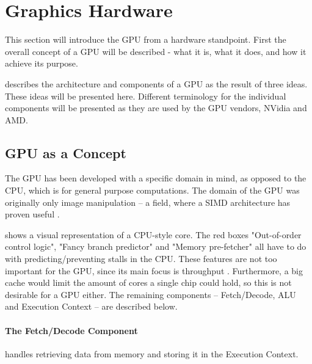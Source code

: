 \section{Graphics Hardware}\label{sec:graphics_hardware}


\begin{sectionmeta}
	
	This section will introduce the \gls{GPU} from a hardware standpoint. 
	First the overall concept of a \gls{GPU} will be described - what it is, what it does, and how it achieve its purpose.
	
	\cite{intro_to_gpu_arch} describes the architecture and components of a \gls{GPU} as the result of three ideas.
	These ideas will be presented here.
	Different terminology for the individual components will be presented as they are used by the \gls{GPU} vendors, NVidia and AMD. 
	
\end{sectionmeta}


\subsection{GPU as a Concept}
The \gls{GPU} has been developed with a specific domain in mind, as opposed to the CPU, which is for general purpose computations. 
The domain of the \gls{GPU} was originally only image manipulation -- a field, where a \gls{SIMD} architecture has proven useful .


 shows a visual representation of a \gls{CPU}-style core. 
The red boxes "Out-of-order control logic", "Fancy branch predictor" and "Memory pre-fetcher" all have to do with predicting/preventing stalls in the \gls{CPU}.
These features are not too important for the \gls{GPU}, since its main focus is throughput . 
Furthermore, a big cache would limit the amount of cores a single chip could hold, so this is not desirable for a \gls{GPU} either.
The remaining components -- Fetch/Decode, \gls{ALU} and Execution Context -- are described below.

\paragraph{The Fetch/Decode Component} handles retrieving data from memory and storing it in the Execution Context.

